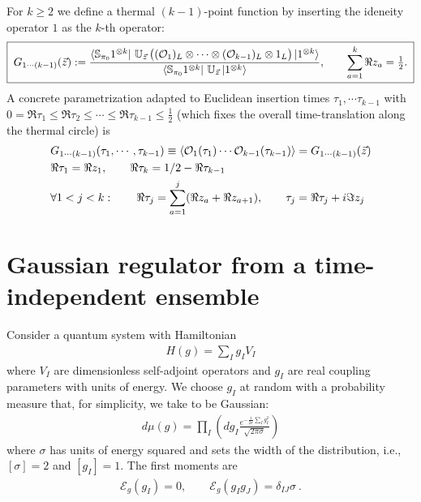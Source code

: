 \documentclass{article}
\theoremstyle{definition}
\newcommand{\nn}{\nonumber}
\newcommand{\lb}{\left(}
\newcommand{\rb}{\right)}
\newcommand{\mO}{\mathcal{O}}
\begin{document}
    For $k\ge 2$ we define a thermal $(k-1)$-point function by inserting the
    ideneity operator $1$ as the $k$-th operator:
    \begin{equation}
        \boxed{\; G_{1\cdots (k-1)}(\vec z) :=\frac{\bra{\mathbb{S}_{\pi_0}1^{\otimes k}}\,\mathbb{U}_{\vec z}\,\big((\mO_{1})_{L}\otimes\cdots\otimes (\mO_{k-1})_{L}\otimes 1_{L}\big)\ket{1^{\otimes k}}}{\bra{\mathbb{S}_{\pi_0}1^{\otimes k}}\,\mathbb{U}_{\vec z}\ket{1^{\otimes k}}},\qquad \sum_{a=1}^k\Re z_a=\tfrac12.\;}
    \end{equation}
    A concrete parametrization adapted to Euclidean insertion times $\tau_{1},\cdots
    \tau_{k-1}$ with $0=\Re\tau_{1}\le \Re\tau_{2}\le\cdots\le \Re\tau_{k-1}\le \tfrac
    12$ (which fixes the overall time-translation along the thermal circle) is
    \begin{align}
         & G_{1\cdots (k-1)}(\tau_{1},\cdots, \tau_{k-1})\equiv\braket{\mO_1(\tau_1)\cdots \mO_{k-1}(\tau_{k-1})}=G_{1\cdots(k-1)}(\vec{z})\nn \\
         & \Re\tau_{1}=\Re z_{1},\qquad \Re\tau_{k}=1/2-\Re\tau_{k-1}\nn                                                                       \\
         & \forall 1<j<k:\qquad \Re\tau_{j}=\sum_{a=1}^{j}(\Re z_{a}+\Re z_{a+1}),\qquad \tau_{j}=\Re \tau_{j}+i\Im z_{j}
    \end{align}


    \section{Gaussian regulator from a time-independent ensemble}

    Consider a quantum system with Hamiltonian
    \begin{eqnarray}
        H(g)=\sum_I g_I V_I
    \end{eqnarray}
    where $V_{I}$ are dimensionless self-adjoint operators and $g_{I}$ are real
    coupling parameters with units of energy. We choose $g_{I}$ at random with a
    probability measure that, for simplicity, we take to be Gaussian:
    \begin{eqnarray}
        d\mu(g)= \prod_I\lb dg_I
        \frac{e^{-\frac{1}{2\sigma}\sum_I g_I^2}}{\sqrt{2\pi \sigma}} \rb
    \end{eqnarray}
    where $\sigma$ has units of energy squared and sets the width of the
    distribution, i.e., $[\sigma]=2$ and $[g_{I}]=1$. The first moments are
    \begin{eqnarray}
        \mathcal{E}_g(g_I)=0, \qquad \mathcal{E}_g(g_I g_J)=\delta_{IJ}\sigma\ .
    \end{eqnarray}
\end{document}
